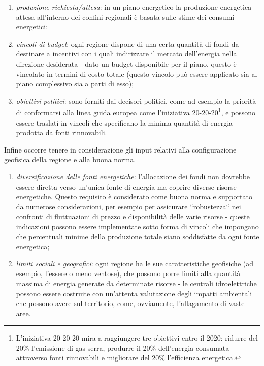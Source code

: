 \documentclass[12pt,a4paper,openright,twoside]{report}
\begin{document}
\begin{enumerate}
\item \emph{produzione richiesta/attesa}: in un piano energetico la produzione energetica attesa all'interno  dei confini regionali è basata sulle stime dei consumi energetici;
\item \emph{vincoli di budget}: ogni regione dispone di una certa quantità di fondi da destinare a incentivi con i quali indirizzare il mercato dell'energia nella direzione desiderata - dato un budget disponibile per il piano, questo è vincolato in termini di costo totale (questo vincolo può essere applicato sia al piano complessivo sia a parti di esso);
\item \emph{obiettivi politici}: sono forniti dai decisori politici, come ad esempio la priorità di conformarsi alla linea guida europea come l'iniziativa 20-20-20\footnote{L'iniziativa 20-20-20 mira a raggiungere tre obiettivi entro il 2020: ridurre del 20\% l'emissione di gas serra, produrre il 20\% dell'energia consumata attraverso fonti rinnovabili e migliorare del 20\% l'efficienza energetica.}, e possono essere traslati in vincoli che specificano la minima quantità di energia prodotta da fonti rinnovabili.
\end{enumerate} 

Infine occorre tenere in considerazione gli input relativi alla configurazione geofisica della regione e alla buona norma.
\begin{enumerate}
\item \emph{diversificazione delle fonti energetiche}: l'allocazione dei fondi non dovrebbe essere diretta verso un'unica fonte di energia ma coprire diverse risorse energetiche. Questo requisito è considerato come buona norma e supportato da numerose considerazioni, per esempio per assicurare ``robustezza`` nei confronti di fluttuazioni di prezzo e disponibilità delle varie risorse - queste indicazioni possono essere implementate sotto forma di vincoli che impongano che percentuali minime della produzione totale siano soddisfatte da ogni fonte energetica;
\item \emph{limiti sociali e geografici}: ogni regione ha le sue caratteristiche geofisiche (ad esempio, l'essere o meno ventose), che possono porre limiti alla quantità massima di energia generate da determinate risorse - le centrali idroelettriche possono essere costruite con un'attenta valutazione degli impatti ambientali che possono avere sul territorio, come, ovviamente, l'allagamento di vaste aree.
\end{enumerate} 
\end{document}
